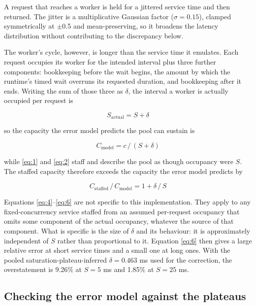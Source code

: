 \documentclass{ieeeaccess}
\begin{document}
A request that reaches a worker is held for a jittered service time and then returned. The jitter is a multiplicative Gaussian factor ($\sigma = 0.15$), clamped symmetrically at $\pm$0.5 and mean-preserving, so it broadens the latency distribution without contributing to the discrepancy below.

The worker's cycle, however, is longer than the service time it emulates. Each request occupies its worker for the intended interval plus three further components: bookkeeping before the wait begins, the amount by which the runtime's timed wait overruns its requested duration, and bookkeeping after it ends. Writing the sum of those three as $\delta$, the interval a worker is actually occupied per request is

\begin{equation}
S_{\mathrm{actual}} = S + \delta
\label{eq:4}
\end{equation}

so the capacity the error model predicts the pool can sustain is

\begin{equation}
C_{\mathrm{model}} = c \,/\, (S + \delta)
\label{eq:5}
\end{equation}

while \eqref{eq:1} and \eqref{eq:2} staff and describe the pool as though occupancy were $S$. The staffed capacity therefore exceeds the capacity the error model predicts by

\begin{equation}
C_{\mathrm{staffed}} \,/\, C_{\mathrm{model}} = 1 + \delta \,/\, S
\label{eq:6}
\end{equation}

Equations \eqref{eq:4}--\eqref{eq:6} are not specific to this implementation. They apply to any fixed-concurrency service staffed from an assumed per-request occupancy that omits some component of the actual occupancy, whatever the source of that component. What is specific is the size of $\delta$ and its behaviour: it is approximately independent of $S$ rather than proportional to it. Equation \eqref{eq:6} then gives a large relative error at short service times and a small one at long ones. With the pooled saturation-plateau-inferred $\delta = 0.463$ ms used for the correction, the overstatement is 9.26\% at $S = 5$ ms and 1.85\% at $S = 25$ ms.

\subsection{Checking the error model against the plateaus}
\end{document}
